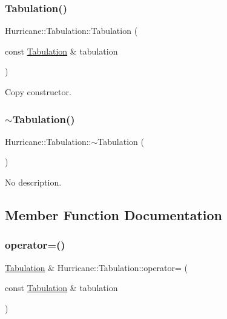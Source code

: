 \subsubsection{\texorpdfstring{Tabulation()}{Tabulation()}\hspace{0.1cm}{\footnotesize\ttfamily [2/2]}}
{\footnotesize\ttfamily Hurricane\+::\+Tabulation\+::\+Tabulation (\begin{DoxyParamCaption}\item[{const \mbox{\hyperlink{classHurricane_1_1Tabulation}{Tabulation}} \&}]{tabulation }\end{DoxyParamCaption})}

Copy constructor. \mbox{\label{classHurricane_1_1Tabulation_aa549d938b7534f8eae8e8e954b1f3207}} 
\subsubsection{\texorpdfstring{$\sim$\+Tabulation()}{~Tabulation()}}
{\footnotesize\ttfamily Hurricane\+::\+Tabulation\+::$\sim$\+Tabulation (\begin{DoxyParamCaption}{ }\end{DoxyParamCaption})}

No description. 

\subsection{Member Function Documentation}
\mbox{\label{classHurricane_1_1Tabulation_a33c4a5152580309407e3e2730f07c321}} 
\subsubsection{\texorpdfstring{operator=()}{operator=()}}
{\footnotesize\ttfamily \mbox{\hyperlink{classHurricane_1_1Tabulation}{Tabulation}} \& Hurricane\+::\+Tabulation\+::operator= (\begin{DoxyParamCaption}\item[{const \mbox{\hyperlink{classHurricane_1_1Tabulation}{Tabulation}} \&}]{tabulation }\end{DoxyParamCaption})}

